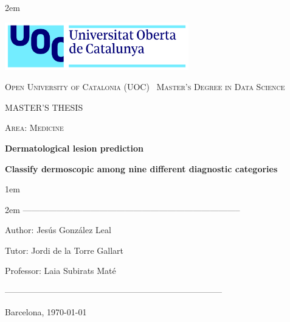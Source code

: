 \newpage
\thispagestyle{empty}

\baselineskip 2em


\centerline{\includegraphics[width=0.6\textwidth]{images/UOC-logo}}
\begin{center}
\textsc{Open University of Catalonia (UOC) \
Master's Degree in Data Science \
}


\vspace*{1.5cm}

\textsc{\Large MASTER'S THESIS}

\vspace*{0.5cm}

\textsc{\large Area: Medicine}


\vspace*{2.0cm}

\textbf{\Large Dermatological lesion prediction}

\textbf{\large Classify dermoscopic among nine different diagnostic categories}

\vspace{2.5cm}
\baselineskip 1em

\baselineskip 2em
-----------------------------------------------------------------------------\

Author: Jesús González Leal\

Tutor: Jordi de la Torre Gallart\

Professor: Laia Subirats Maté\

-----------------------------------------------------------------------------\

\vspace*{1.5cm}
Barcelona, \today

\end{center}

\newpage
\pagestyle{empty}
\hfill